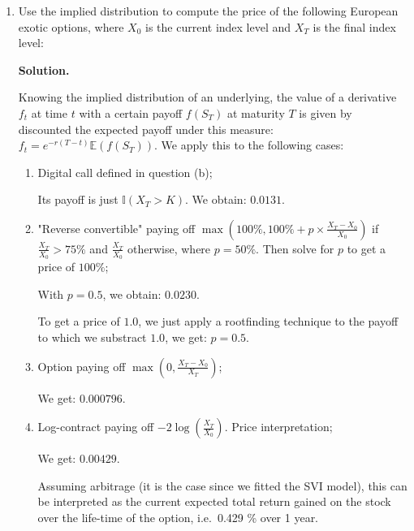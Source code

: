 \documentclass[12pt]{article}
\newenvironment{solution}{\vspace{0.2cm} \textbf{Solution.}}{}
\begin{document}
\begin{enumerate}[label=(\alph*)]
		\item Use the implied distribution to compute the price of the following European exotic options, where $X_0$ is the current index level and $X_T$ is the final index level:

		\begin{solution}
			
			Knowing the implied distribution of an underlying, the value of a derivative $f_t$ at time $t$ with a certain payoff $f(S_T)$ at maturity $T$ is given by discounted the expected payoff under this measure: $f_t = e^{-r(T-t)}\mathbb{E}(f(S_T))$. We apply this to the following cases:

			\begin{enumerate}[label=(\roman*)]

				\item Digital call defined in question (b);

				Its payoff is just $\mathbb{I}(X_T > K)$. We obtain: $0.0131$.

				\item "Reverse convertible" paying off $\max\left(100\%, 100\% + p \times \frac{X_T- X_0}{X_0}\right)$ if $\frac{X_T}{X_0} > 75 \%$ and $\frac{X_T}{X_0}$ otherwise, where $p = 50\%$. Then solve for $p$ to get a price of $100\%$;

				With $p=0.5$, we obtain: $0.0230$.
				
				To get a price of $1.0$, we just apply a rootfinding technique to the payoff to which we substract $1.0$, we get: $p=0.5$.
				
				
				\item Option paying off $\max\left(0, \frac{X_T- X_0}{X_T}\right)$;

				We get: $0.000796$.

				\item Log-contract paying off $-2\log\left(\frac{X_T}{X_0}\right)$. Price interpretation;

				We get: $0.00429$.
				
				Assuming arbitrage (it is the case since we fitted the SVI model), this can be interpreted as the current expected total return gained on the stock over the life-time of the option, i.e.\ 0.429 \% over 1 year.
			\end{enumerate}

		\end{solution}

	\end{enumerate}

\newpage
\end{document}

